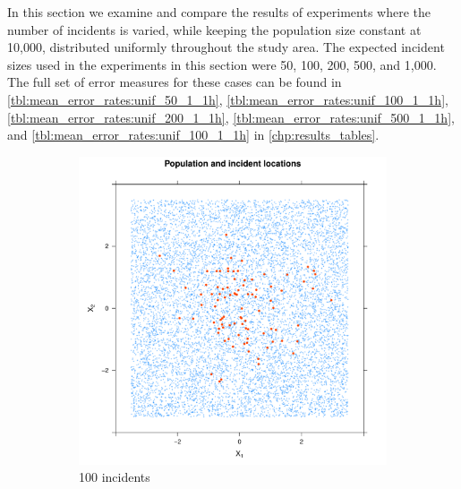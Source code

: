 In this section we examine and compare the results of experiments where the number of incidents is varied, while keeping the population size constant at 10,000, distributed uniformly throughout the study area.
The expected incident sizes used in the experiments in this section were 50, 100, 200, 500, and 1,000.
The full set of error measures for these cases can be found in \autoref{tbl:mean_error_rates:unif_50_1_1h}, \autoref{tbl:mean_error_rates:unif_100_1_1h}, \autoref{tbl:mean_error_rates:unif_200_1_1h}, \autoref{tbl:mean_error_rates:unif_500_1_1h}, and \autoref{tbl:mean_error_rates:unif_100_1_1h} in \autoref{chp:results_tables}.


\begin{figure}[htbp]
    \centering
    \begin{subfigure}{0.45\textwidth}
    \includegraphics[width=\textwidth]{results/unif_100_1_1h/output/population_and_incidents_scatter}
    \caption{100 incidents}
    \end{subfigure}
    \begin{subfigure}{0.45\textwidth}

\end{subfigure}
\end{figure}
